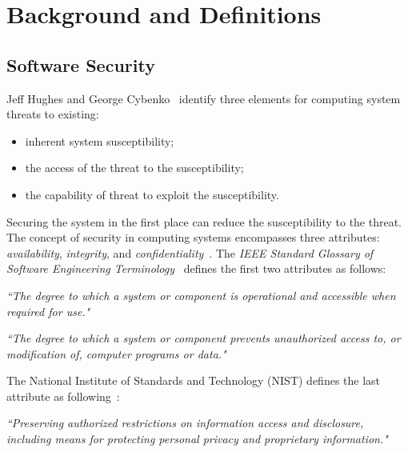 \section{Background and Definitions}

\subsection{Software Security}
\newline
Jeff Hughes and George Cybenko~\cite{Hughes2013QuantitativeMA} identify three elements for computing system threats to existing:
\begin{itemize}
    \item inherent system susceptibility;
    \item the access of the threat to the susceptibility;
    \item the capability of threat to exploit the susceptibility.
\end{itemize}
Securing the system in the first place can reduce the susceptibility to the threat. The concept of security in computing systems encompasses three attributes: \textit{availability}, \textit{integrity}, and \textit{confidentiality}~\cite{concepts_secure_computing}. The \textit{IEEE Standard Glossary of Software Engineering Terminology}~\cite{standard_terms} defines the first two attributes as follows:

\theoremstyle{definition}
\begin{definition}[Availability]
\textit{``The degree to which a system or component is operational and accessible when required for use."}
\end{definition}

\theoremstyle{definition}
\begin{definition}[Integrity]
\textit{``The degree to which a system or component prevents unauthorized access to, or modification of, computer programs or data."}
\end{definition}

The National Institute of Standards and Technology (NIST) defines the last attribute as following~\cite{nist_glossary}:

\theoremstyle{definition}
\begin{definition}[Confidentiality]
\textit{``Preserving authorized restrictions on information access and disclosure, including means for protecting personal privacy and proprietary information."}
\end{definition}

